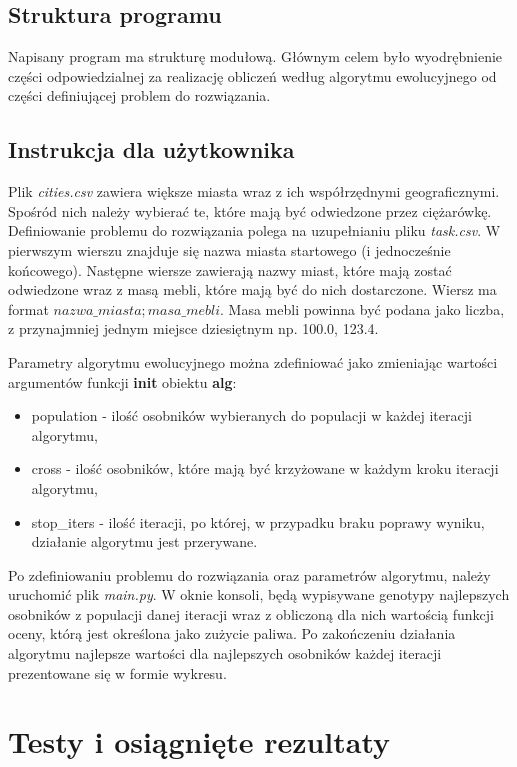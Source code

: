 \documentclass[12pt, oneside, final]{report}
\begin{document}
\section{Struktura programu}
Napisany program ma strukturę modułową. Głównym celem było wyodrębnienie części odpowiedzialnej za realizację obliczeń według algorytmu ewolucyjnego od części definiującej problem do rozwiązania.

\section{Instrukcja dla użytkownika}
Plik \textit{cities.csv} zawiera większe miasta wraz z ich współrzędnymi geograficznymi. Spośród nich należy wybierać te, które mają być odwiedzone przez ciężarówkę. Definiowanie problemu do rozwiązania polega na uzupełnianiu pliku \textit{task.csv}. W pierwszym wierszu znajduje się nazwa miasta startowego (i jednocześnie końcowego). Następne wiersze zawierają nazwy miast, które mają zostać odwiedzone wraz z masą mebli, które mają być do nich dostarczone. Wiersz ma format $nazwa\_miasta;masa\_mebli$. Masa mebli powinna być podana jako liczba, z przynajmniej jednym miejsce dziesiętnym np. 100.0, 123.4.

Parametry algorytmu ewolucyjnego można zdefiniować jako zmieniając wartości argumentów funkcji \textbf{init} obiektu \textbf{alg}:
\begin{itemize}
\item population - ilość osobników wybieranych do populacji w każdej iteracji algorytmu,
\item cross - ilość osobników, które mają być krzyżowane w każdym kroku iteracji algorytmu,
\item stop\_iters - ilość iteracji, po której, w przypadku braku poprawy wyniku, działanie algorytmu jest przerywane.
\end{itemize}

Po zdefiniowaniu problemu do rozwiązania oraz parametrów algorytmu, należy uruchomić plik \textit{main.py}. W oknie konsoli, będą wypisywane genotypy najlepszych osobników z populacji danej iteracji wraz z obliczoną dla nich wartością funkcji oceny, którą jest określona jako zużycie paliwa. %
 Po zakończeniu działania algorytmu najlepsze wartości dla najlepszych osobników każdej iteracji prezentowane się w formie wykresu.

\chapter{Testy i osiągnięte rezultaty}
\end{document}
